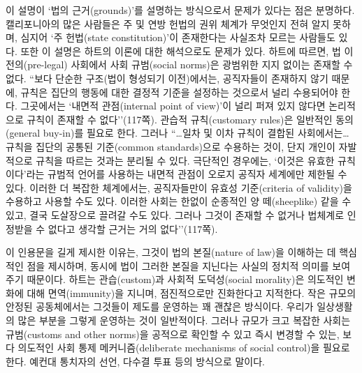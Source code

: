 \documentclass[12pt, oneside]{book}  %
\begin{document}
이 설명이 `법의 근거(grounds)'를 설명하는 방식으로서 문제가 있다는 점은
분명하다. 캘리포니아의 많은 사람들은 주 및 연방 헌법의 권위 체계가
무엇인지 전혀 알지 못하며, 심지어 `주 헌법(state constitution)'이
존재한다는 사실조차 모르는 사람들도 있다. 또한 이 설명은 하트의 이론에
대한 해석으로도 문제가 있다. 하트에 따르면, 법 이전의(pre-legal)
사회에서 사회 규범(social norms)은 광범위한 지지 없이는 존재할 수 없다.
``보다 단순한 구조(법이 형성되기 이전)에서는, 공직자들이 존재하지 않기
때문에, 규칙은 집단의 행동에 대한 결정적 기준을 설정하는 것으로서 널리
수용되어야 한다. 그곳에서는 `내면적 관점(internal point of view)'이 널리
퍼져 있지 않다면 논리적으로 규칙이 존재할 수 없다''(117쪽). 관습적
규칙(customary rules)은 일반적인 동의(general buy-in)를 필요로 한다.
그러나 ``\ldots 일차 및 이차 규칙이 결합된 사회에서는\ldots{} 규칙을
집단의 공통된 기준(common standards)으로 수용하는 것이, 단지 개인이
자발적으로 규칙을 따르는 것과는 분리될 수 있다. 극단적인 경우에는,
`이것은 유효한 규칙이다'라는 규범적 언어를 사용하는 내면적 관점이 오로지
공직자 세계에만 제한될 수 있다. 이러한 더 복잡한 체계에서는,
공직자들만이 유효성 기준(criteria of validity)을 수용하고 사용할 수도
있다. 이러한 사회는 한없이 순종적인 양 떼(sheeplike) 같을 수 있고, 결국
도살장으로 끌려갈 수도 있다. 그러나 그것이 존재할 수 없거나 법체계로
인정받을 수 없다고 생각할 근거는 거의 없다''(117쪽).

이 인용문을 길게 제시한 이유는, 그것이 법의 본질(nature of law)을
이해하는 데 핵심적인 점을 제시하며, 동시에 법이 그러한 본질을 지닌다는
사실의 정치적 의미를 보여주기 때문이다. 하트는 관습(custom)과 사회적
도덕성(social morality)은 의도적인 변화에 대해 면역(immunity)을 지니며,
점진적으로만 진화한다고 지적한다. 작은 규모의 안정된 공동체에서는
그것들이 제도를 운영하는 꽤 괜찮은 방식이다. 우리가 일상생활의 많은
부분을 그렇게 운영하는 것이 일반적이다. 그러나 규모가 크고 복잡한 사회는
규범(customs and other norms)을 공적으로 확인할 수 있고 즉시 변경할 수
있는, 보다 의도적인 사회 통제 메커니즘(deliberate mechanisms of social
control)을 필요로 한다. 예컨대 통치자의 선언, 다수결 투표 등의 방식으로
말이다.
\end{document}

